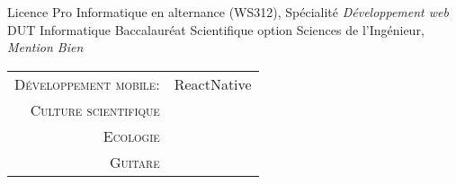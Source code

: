 %
%
%






\twocolumnsectionvariant
{
\vspace{0.25cm}
\begin{scholarship}
					{Licence Pro Informatique en alternance (WS312), Spécialité \emph{Développement web}}
					{DUT Informatique}
					{Baccalauréat Scientifique option Sciences de l'Ingénieur, \emph{Mention Bien}}
\end{scholarship}}
{
\vspace{0.25cm}
\begin{tabular}{rl}
    \textsc{Développement mobile:} & ReactNative\\
    \textsc{Culture scientifique} & \\
    \textsc{Ecologie} & \\
    \textsc{Guitare} & \\
\end{tabular}
}
